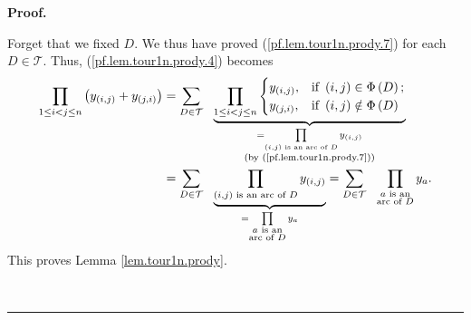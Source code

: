 \documentclass[numbers=enddot,12pt,final,onecolumn,notitlepage]{scrartcl}%
\numberwithin{exer}{subsection}
\theoremstyle{definition}
\newenvironment{fineprint}{\begin{small}}{\end{small}}
\newenvironment{proof}[1][Proof]{\noindent\textbf{#1.} }{\ \rule{0.5em}{0.5em}}
\let\sumnonlimits\sum
\let\prodnonlimits\prod
\renewcommand{\sum}{\sumnonlimits\limits}
\renewcommand{\prod}{\prodnonlimits\limits}
\begin{document}
\begin{proof}
\begin{fineprint}
Forget that we fixed $D$. We thus have proved (\ref{pf.lem.tour1n.prody.7})
for each $D\in\mathcal{T}$. Thus, (\ref{pf.lem.tour1n.prody.4}) becomes%
\begin{align*}
\prod_{1\leq i<j\leq n}\left(  y_{\left(  i,j\right)  }+y_{\left(  j,i\right)
}\right)   &  =\sum_{D\in\mathcal{T}}\ \ \underbrace{\prod_{1\leq i<j\leq n}%
\begin{cases}
y_{\left(  i,j\right)  }, & \text{if }\left(  i,j\right)  \in\Phi\left(
D\right)  ;\\
y_{\left(  j,i\right)  }, & \text{if }\left(  i,j\right)  \notin\Phi\left(
D\right)
\end{cases}
}_{\substack{=\prod_{\left(  i,j\right)  \text{ is an arc of }D}y_{\left(
i,j\right)  }\\\text{(by (\ref{pf.lem.tour1n.prody.7}))}}}\\
&  =\sum_{D\in\mathcal{T}}\ \ \underbrace{\prod_{\left(  i,j\right)  \text{ is
an arc of }D}y_{\left(  i,j\right)  }}_{=\prod_{\substack{a\text{ is
an}\\\text{arc of }D}}y_{a}}=\sum_{D\in\mathcal{T}}\ \ \prod
_{\substack{a\text{ is an}\\\text{arc of }D}}y_{a}.
\end{align*}
This proves Lemma \ref{lem.tour1n.prody}.
\end{fineprint}
\end{proof}
\end{document}
